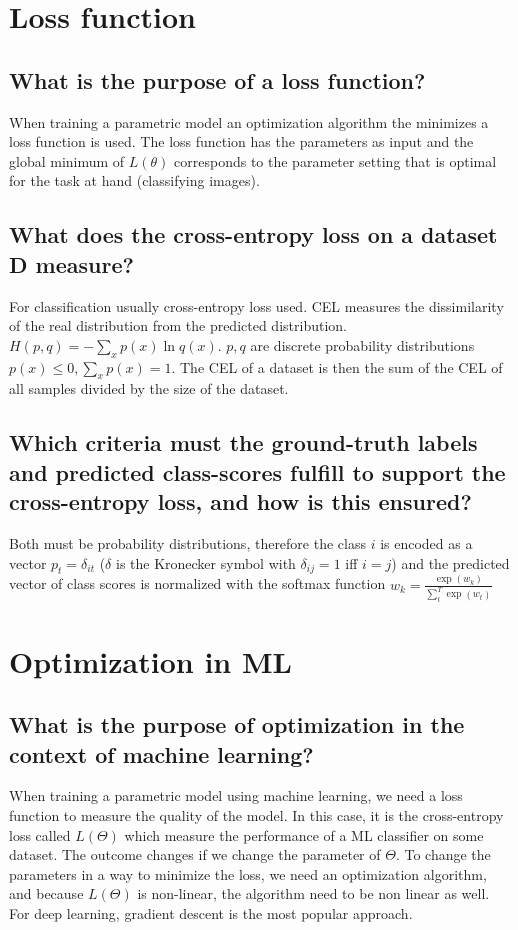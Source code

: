 \section{Loss function}
\subsection{What is the purpose of a loss function?}
When training a parametric model an optimization algorithm the minimizes a loss function is used. The loss function has the parameters as input and the global minimum of $L(\theta)$ corresponds to the parameter setting that is optimal for the task at hand (classifying images).
\subsection{What does the cross-entropy loss on a dataset D measure?}
For classification usually cross-entropy loss used. CEL measures the dissimilarity of the real distribution from the predicted distribution. $H(p,q) = -\sum_x p(x) \ln q(x)$. $p,q$ are discrete probability distributions $p(x)\leq 0, \sum_x p(x) = 1$. The CEL of a dataset is then the sum of the CEL of all samples divided by the size of the dataset. 
\subsection{Which criteria must the ground-truth labels and predicted class-scores fulfill to support the cross-entropy loss, and how is this ensured?}
Both must be probability distributions, therefore the class $i$ is encoded as a vector $p_t = \delta_{it}$ ($\delta$ is the Kronecker symbol with $\delta_{ij} = 1$ iff $i = j$) and the predicted vector of class scores is normalized with the softmax function $w_k =  \frac{\exp(w_k)}{\sum_t^T \exp(w_t)}$

\section{Optimization in ML}
\subsection{What is the purpose of optimization in the context of machine learning?}

When training a parametric model using machine learning, we need a loss function to measure the quality of the model. In this case, it is the cross-entropy loss called $L(\Theta)$ which measure the performance of a ML classifier on some dataset. The outcome changes if we change the parameter of $\Theta$. To change the parameters in a way to minimize the loss, we need an optimization algorithm, and because $L(\Theta)$ is non-linear, the algorithm need to be non linear as well. For deep learning, gradient descent is the most popular approach.

